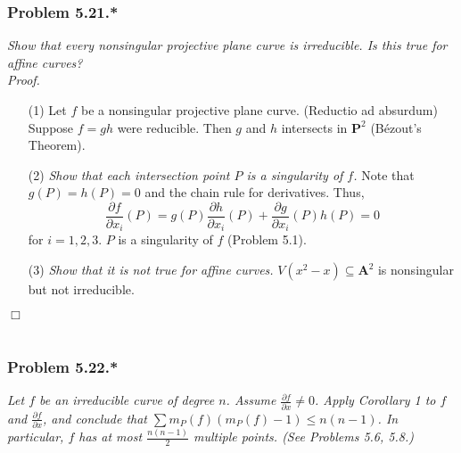 \documentclass{article}
\begin{document}




\subsubsection*{Problem 5.21.*}
\emph{Show that every nonsingular projective plane curve is irreducible.
Is this true for affine curves?} \\



\emph{Proof.}
\begin{enumerate}
\item[(1)]
  Let $f$ be a nonsingular projective plane curve.
  (Reductio ad absurdum)
  Suppose $f = gh$ were reducible.
  Then $g$ and $h$ intersects in $\mathbf{P}^2$ (B\'ezout's Theorem).

\item[(2)]
  \emph{Show that each intersection point $P$ is a singularity of $f$.}
  Note that $g(P) = h(P) = 0$ and the chain rule for derivatives.
  Thus,
  \[
    \frac{\partial f}{\partial x_i}(P)
    = g(P) \frac{\partial h}{\partial x_i}(P) + \frac{\partial g}{\partial x_i}(P) h(P) = 0
  \]
  for $i = 1,2,3$.
  $P$ is a singularity of $f$ (Problem 5.1).

\item[(3)]
  \emph{Show that it is not true for affine curves.}
  $V(x^2 - x) \subseteq \mathbf{A}^2$ is nonsingular but not irreducible.
\end{enumerate}
$\Box$ \\\\







\subsubsection*{Problem 5.22.*}
\emph{Let $f$ be an irreducible curve of degree $n$.
Assume $\frac{\partial f}{\partial x} \neq 0$.
Apply Corollary 1 to $f$ and $\frac{\partial f}{\partial x}$,
and conclude that $\sum m_P(f)(m_P(f)-1) \leq n(n-1)$.
In particular, $f$ has at most $\frac{n(n-1)}{2}$ multiple points.
(See Problems 5.6, 5.8.)} \\
\end{document}
